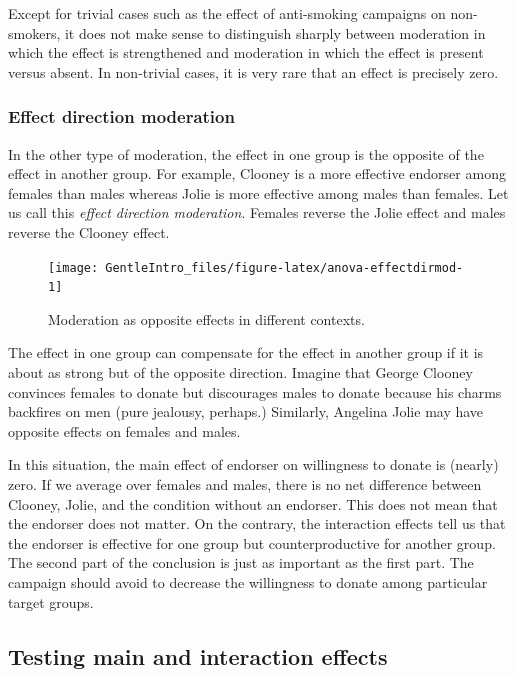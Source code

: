 \documentclass[a4paper]{book}
\theoremstyle{definition}
\theoremstyle{definition}
\theoremstyle{definition}
\theoremstyle{remark}
\begin{document}
Except for trivial cases such as the effect of anti-smoking campaigns on
non-smokers, it does not make sense to distinguish sharply between
moderation in which the effect is strengthened and moderation in which
the effect is present versus absent. In non-trivial cases, it is very
rare that an effect is precisely zero.

\subsubsection{Effect direction
moderation}\label{effect-direction-moderation}

In the other type of moderation, the effect in one group is the opposite
of the effect in another group. For example, Clooney is a more effective
endorser among females than males whereas Jolie is more effective among
males than females. Let us call this \emph{effect direction moderation}.
Females reverse the Jolie effect and males reverse the Clooney effect.

\begin{figure}[H]
\texttt{[image: GentleIntro\_files/figure-latex/anova-effectdirmod-1]} \caption{Moderation as opposite effects in different contexts.}\label{fig:anova-effectdirmod}
\end{figure}

The effect in one group can compensate for the effect in another group
if it is about as strong but of the opposite direction. Imagine that
George Clooney convinces females to donate but discourages males to
donate because his charms backfires on men (pure jealousy, perhaps.)
Similarly, Angelina Jolie may have opposite effects on females and
males.

In this situation, the main effect of endorser on willingness to donate
is (nearly) zero. If we average over females and males, there is no net
difference between Clooney, Jolie, and the condition without an
endorser. This does not mean that the endorser does not matter. On the
contrary, the interaction effects tell us that the endorser is effective
for one group but counterproductive for another group. The second part
of the conclusion is just as important as the first part. The campaign
should avoid to decrease the willingness to donate among particular
target groups.

\subsection{Testing main and interaction
effects}\label{testing-main-and-interaction-effects}
\end{document}

